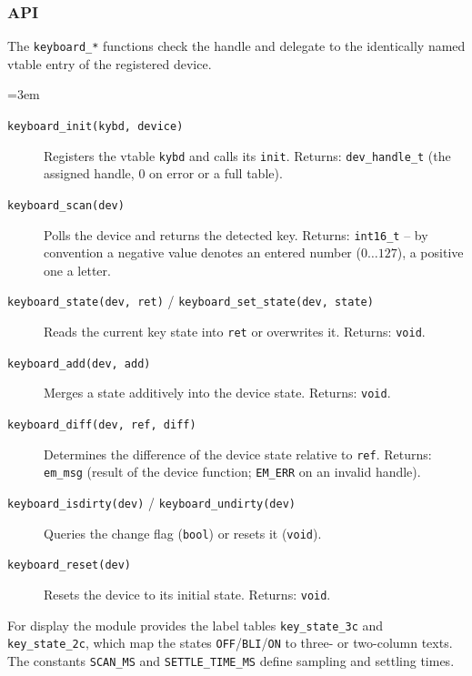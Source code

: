 \subsubsection*{API}
The \verb|keyboard_*| functions check the handle and delegate to the
identically named vtable entry of the registered device.
{\sloppy\emergencystretch=3em
\begin{description}
\item[\texttt{keyboard\_init(kybd, device)}] Registers the vtable \verb|kybd|
  and calls its \verb|init|. Returns: \verb|dev_handle_t| (the assigned handle,
  $0$ on error or a full table).
\item[\texttt{keyboard\_scan(dev)}] Polls the device and returns the detected
  key. Returns: \verb|int16_t| -- by convention a negative value denotes an
  entered number ($0\dots127$), a positive one a letter.
\item[\texttt{keyboard\_state(dev, ret)} / \texttt{keyboard\_set\_state(dev, state)}]
  Reads the current key state into \verb|ret| or overwrites it. Returns:
  \verb|void|.
\item[\texttt{keyboard\_add(dev, add)}] Merges a state additively into the
  device state. Returns: \verb|void|.
\item[\texttt{keyboard\_diff(dev, ref, diff)}] Determines the difference of the
  device state relative to \verb|ref|. Returns: \verb|em_msg| (result of the
  device function; \verb|EM_ERR| on an invalid handle).
\item[\texttt{keyboard\_isdirty(dev)} / \texttt{keyboard\_undirty(dev)}]
  Queries the change flag (\verb|bool|) or resets it (\verb|void|).
\item[\texttt{keyboard\_reset(dev)}] Resets the device to its initial state.
  Returns: \verb|void|.
\end{description}
\par}

\noindent For display the module provides the label tables
\verb|key_state_3c| and \verb|key_state_2c|, which map the states
\verb|OFF|/\verb|BLI|/\verb|ON| to three- or two-column texts. The constants
\verb|SCAN_MS| and \verb|SETTLE_TIME_MS| define sampling and settling times.
